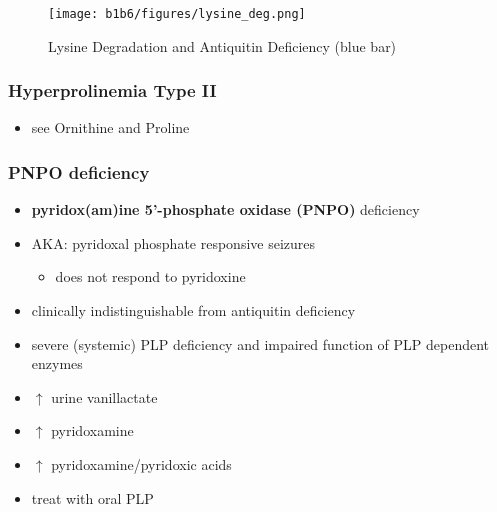 \documentclass[12pt]{scrartcl}
\begin{document}
\begin{figure}[htbp]
\centering
\texttt{[image: b1b6/figures/lysine\_deg.png]}
\caption{\label{fig:orge716844}Lysine Degradation and Antiquitin Deficiency (blue bar)}
\end{figure}

\subsubsection{Hyperprolinemia Type II}
\label{sec:org07934f4}
\begin{itemize}
\item see Ornithine and Proline
\end{itemize}

\subsubsection{PNPO deficiency}
\label{sec:org4a020ec}
\begin{itemize}
\item \textbf{pyridox(am)ine 5’-phosphate oxidase (PNPO)} deficiency
\item AKA: pyridoxal phosphate responsive seizures
\begin{itemize}
\item does not respond to pyridoxine
\end{itemize}
\item clinically indistinguishable from antiquitin deficiency
\item severe (systemic) PLP deficiency and impaired function of PLP
dependent enzymes
\item \(\uparrow\) urine vanillactate
\item \(\uparrow\) pyridoxamine
\item \(\uparrow\) pyridoxamine/pyridoxic acids
\item treat with oral PLP
\end{itemize}
\end{document}
